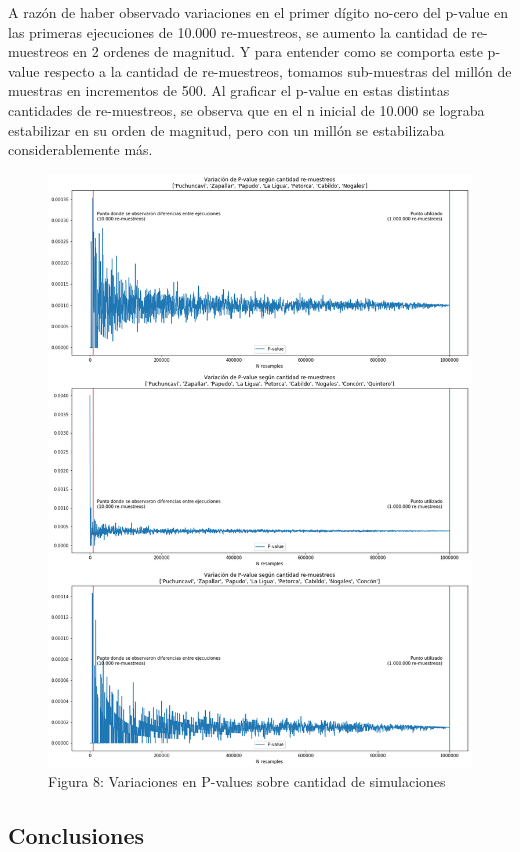\documentclass[]{article}
\begin{document}
A razón de haber observado variaciones en el primer dígito no-cero del
p-value en las primeras ejecuciones de 10.000 re-muestreos, se aumento
la cantidad de re-muestreos en 2 ordenes de magnitud. Y para entender
como se comporta este p-value respecto a la cantidad de re-muestreos,
tomamos sub-muestras del millón de muestras en incrementos de 500. Al
graficar el p-value en estas distintas cantidades de re-muestreos, se
observa que en el n inicial de 10.000 se lograba estabilizar en su orden
de magnitud, pero con un millón se estabilizaba considerablemente más.

\begin{figure}
\centering
\includegraphics{assets/variacion-p-values.png}
\caption{Figura 8: Variaciones en P-values sobre cantidad de simulaciones}
\end{figure}

\hypertarget{conclusiones}{%
\subsection{Conclusiones}\label{conclusiones}}
\end{document}
